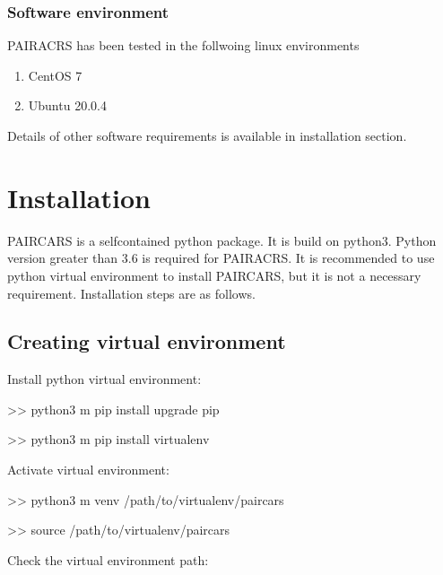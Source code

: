 \documentclass[letterpaper,10pt,english]{sphinxmanual}
\begin{document}
\subsection{Software environment}
\label{\detokenize{intro:software-environment}}
\sphinxAtStartPar
P\sphinxhyphen{}AIRACRS has been tested in the follwoing linux environments
\begin{enumerate}
%
\item {} 
\sphinxAtStartPar
CentOS 7

\item {} 
\sphinxAtStartPar
Ubuntu 20.0.4

\end{enumerate}

\sphinxAtStartPar
Details of other software requirements is available in installation section.


\chapter{Installation}
\label{\detokenize{install:installation}}\label{\detokenize{install::doc}}
\sphinxAtStartPar
P\sphinxhyphen{}AIRCARS is a self\sphinxhyphen{}contained python package. It is build on python3. Python version greater than 3.6 is required for P\sphinxhyphen{}AIRACRS. It is recommended to use python virtual environment to install P\sphinxhyphen{}AIRCARS, but it is not a necessary requirement. Installation steps are as follows.


\section{Creating virtual environment}
\label{\detokenize{install:creating-virtual-environment}}
\sphinxAtStartPar
Install python virtual environment:

\sphinxAtStartPar
\textgreater{}\textgreater{} python3 \sphinxhyphen{}m pip install \textendash{}upgrade pip

\sphinxAtStartPar
\textgreater{}\textgreater{} python3 \sphinxhyphen{}m pip install virtualenv

\sphinxAtStartPar
Activate virtual environment:

\sphinxAtStartPar
\textgreater{}\textgreater{} python3 \sphinxhyphen{}m venv /path/to/virtualenv/paircars

\sphinxAtStartPar
\textgreater{}\textgreater{} source /path/to/virtualenv/paircars

\sphinxAtStartPar
Check the virtual environment path:
\end{document}
